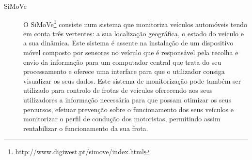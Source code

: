 \begin{description}
	\item[SiMoVe] O SiMoVe\footnote{http://www.digiwest.pt/simove/index.html} consiste num sistema que monitoriza veículos automóveis tendo em conta três vertentes: a sua localização geográfica, o estado do veículo e a sua dinâmica. Este sistema é assente na instalação de um dispositivo móvel composto por sensores no veículo que é responsável pela recolha e envio da informação para um computador central que trata do seu processamento e oferece uma interface para que o utilizador consiga visualizar os seus dados. Este sistema de monitorização pode também ser utilizado para controlo de frotas de veículos oferecendo aos seus utilizadores a informação necessária para que possam otimizar os seus percursos, efetuar prevenção sobre o funcionamento dos seus veículos e monitorizar o perfil de condução dos motoristas, permitindo assim rentabilizar o funcionamento da sua frota.


\end{description}


